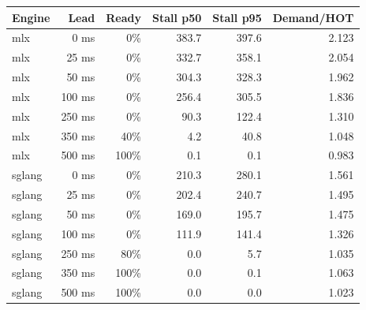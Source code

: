 \begin{tabular}{lrrrrr}
\toprule
Engine & Lead & Ready & Stall p50 & Stall p95 & Demand/HOT \\
\midrule
mlx & 0 ms & 0\% & 383.7 & 397.6 & 2.123 \\
mlx & 25 ms & 0\% & 332.7 & 358.1 & 2.054 \\
mlx & 50 ms & 0\% & 304.3 & 328.3 & 1.962 \\
mlx & 100 ms & 0\% & 256.4 & 305.5 & 1.836 \\
mlx & 250 ms & 0\% & 90.3 & 122.4 & 1.310 \\
mlx & 350 ms & 40\% & 4.2 & 40.8 & 1.048 \\
mlx & 500 ms & 100\% & 0.1 & 0.1 & 0.983 \\
sglang & 0 ms & 0\% & 210.3 & 280.1 & 1.561 \\
sglang & 25 ms & 0\% & 202.4 & 240.7 & 1.495 \\
sglang & 50 ms & 0\% & 169.0 & 195.7 & 1.475 \\
sglang & 100 ms & 0\% & 111.9 & 141.4 & 1.326 \\
sglang & 250 ms & 80\% & 0.0 & 5.7 & 1.035 \\
sglang & 350 ms & 100\% & 0.0 & 0.1 & 1.063 \\
sglang & 500 ms & 100\% & 0.0 & 0.0 & 1.023 \\
\bottomrule
\end{tabular}
